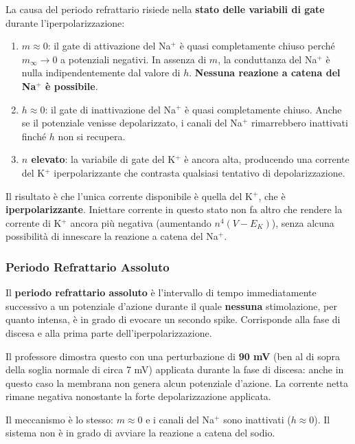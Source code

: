 La causa del periodo refrattario risiede nella \textbf{stato delle variabili di gate} durante l'iperpolarizzazione:

\begin{enumerate}
    \item \textbf{$m \approx 0$}: il gate di attivazione del Na$^+$ è quasi completamente chiuso perché $m_\infty \to 0$ a potenziali negativi. In assenza di $m$, la conduttanza del Na$^+$ è nulla indipendentemente dal valore di $h$. \textbf{Nessuna reazione a catena del Na$^+$ è possibile}.
    \item \textbf{$h \approx 0$}: il gate di inattivazione del Na$^+$ è quasi completamente chiuso. Anche se il potenziale venisse depolarizzato, i canali del Na$^+$ rimarrebbero inattivati finché $h$ non si recupera.
    \item \textbf{$n$ elevato}: la variabile di gate del K$^+$ è ancora alta, producendo una corrente del K$^+$ iperpolarizzante che contrasta qualsiasi tentativo di depolarizzazione.
\end{enumerate}

Il risultato è che l'unica corrente disponibile è quella del K$^+$, che è \textbf{iperpolarizzante}. Iniettare corrente in questo stato non fa altro che rendere la corrente di K$^+$ ancora più negativa (aumentando $n^4 (V - E_K)$), senza alcuna possibilità di innescare la reazione a catena del Na$^+$.


\subsubsection{Periodo Refrattario Assoluto}

Il \textbf{periodo refrattario assoluto} è l'intervallo di tempo immediatamente successivo a un potenziale d'azione durante il quale \textbf{nessuna} stimolazione, per quanto intensa, è in grado di evocare un secondo spike. Corrisponde alla fase di discesa e alla prima parte dell'iperpolarizzazione.

Il professore dimostra questo con una perturbazione di \textbf{90 mV} (ben al di sopra della soglia normale di circa 7 mV) applicata durante la fase di discesa: anche in questo caso la membrana non genera alcun potenziale d'azione. La corrente netta rimane negativa nonostante la forte depolarizzazione applicata.

Il meccanismo è lo stesso: $m \approx 0$ e i canali del Na$^+$ sono inattivati ($h \approx 0$). Il sistema non è in grado di avviare la reazione a catena del sodio.

